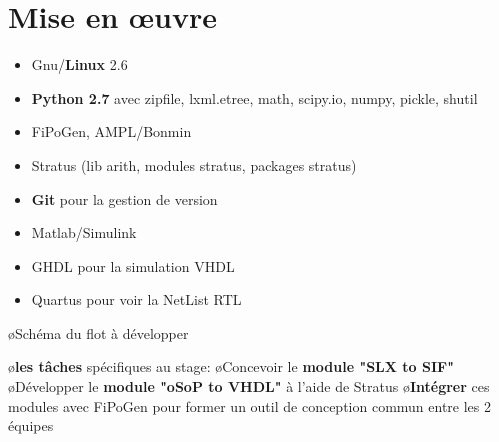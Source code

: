 \section{Mise en \oe{}uvre}
\hspace*{2cm}
\frame{\tableofcontents[currentsection]}
\begin{frame} 
\begin{itemize}
\item Gnu/\textbf{Linux} 2.6
\item \textbf{Python 2.7} avec zipfile, lxml.etree, math, scipy.io, numpy, pickle, shutil  
\item FiPoGen, AMPL/Bonmin
\item Stratus (lib arith, modules stratus, packages stratus)
\item \textbf{Git} pour la gestion de version
\item Matlab/Simulink
\item GHDL pour la simulation VHDL
\item Quartus pour voir la NetList RTL
\end{itemize}
\end{frame}

\begin{frame} 
    \BI
	\o Schéma du flot à développer
	\begin{flushleft}
	\begin{center}
	\end{center}		
	\end{flushleft}
	\smallskip	
	\o \textbf{les tâches} spécifiques au stage:
		\BI 
		\o Concevoir le \textbf{module "SLX to SIF"}
		\o Développer le \textbf{module "oSoP to VHDL"} à l'aide de Stratus
		\o \textbf{Intégrer} ces modules avec FiPoGen pour former un outil de conception commun entre les 2 équipes
		\EI
	\EI
{}
\end{frame}

